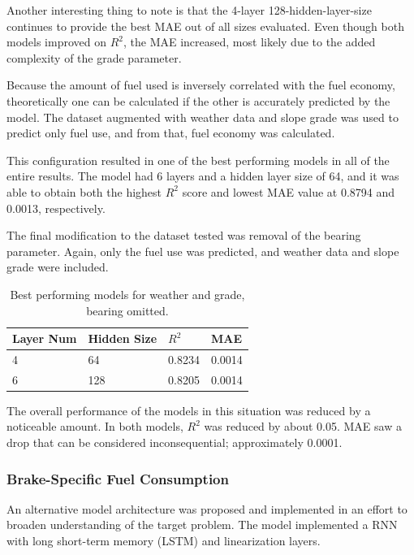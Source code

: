\documentclass[letterpaper]{article}
\begin{document}
Another interesting thing to note is that the 4-layer 128-hidden-layer-size 
continues to provide the best MAE out of all sizes evaluated. Even though 
both models improved on $R^{2}$, the MAE increased, most likely due to the 
added complexity of the grade parameter.

Because the amount of fuel used is inversely correlated with the fuel 
economy, theoretically one can be calculated if the other is accurately 
predicted by the model. The dataset augmented with weather data and slope 
grade was used to predict only fuel use, and from that, fuel economy was 
calculated.

This configuration resulted in one of the best performing models in all of 
the entire results. The model had 6 layers and a hidden layer size of 64, 
and it was able to obtain both the highest $R^{2}$ score and lowest MAE 
value at 0.8794 and 0.0013, respectively.

The final modification to the dataset tested was removal of the bearing 
parameter. Again, only the fuel use was predicted, and weather data and 
slope grade were included.

\begin{table}[]
\begin{tabular}{|l|l|l|l|}
    \hline
    \textbf{Layer Num} & \textbf{Hidden Size} & \textbf{$R^{2}$} & \textbf{MAE} \\
    \hline
    4              	& 64               	& 0.8234  	& 0.0014   	\\
    6              	& 128              	& 0.8205  	& 0.0014 	\\
    \hline
\end{tabular}
\caption{Best performing models for weather and grade, bearing omitted.}
\label{tab:tb4}
\end{table}

The overall performance of the models in this situation was reduced by a 
noticeable amount. In both models, $R^{2}$ was reduced by about 0.05. MAE 
saw a drop that can be considered inconsequential; approximately 0.0001.

\subsubsection*{Brake-Specific Fuel Consumption}

An alternative model architecture was proposed and implemented in an effort 
to broaden understanding of the target problem. The model implemented a 
RNN with long short-term memory (LSTM) and linearization layers.
\end{document}
